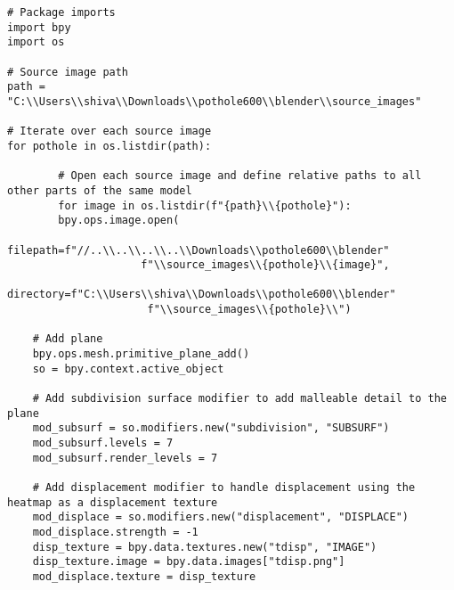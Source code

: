 \documentclass{article}
\begin{document}
\begin{code}
\label{code:blender}
\begin{verbatim}
# Package imports
import bpy
import os

# Source image path
path = "C:\\Users\\shiva\\Downloads\\pothole600\\blender\\source_images"

# Iterate over each source image
for pothole in os.listdir(path):

        # Open each source image and define relative paths to all other parts of the same model
        for image in os.listdir(f"{path}\\{pothole}"):
        bpy.ops.image.open(
            filepath=f"//..\\..\\..\\..\\Downloads\\pothole600\\blender"
                     f"\\source_images\\{pothole}\\{image}",
            directory=f"C:\\Users\\shiva\\Downloads\\pothole600\\blender"
                      f"\\source_images\\{pothole}\\")

    # Add plane
    bpy.ops.mesh.primitive_plane_add()
    so = bpy.context.active_object

    # Add subdivision surface modifier to add malleable detail to the plane
    mod_subsurf = so.modifiers.new("subdivision", "SUBSURF")
    mod_subsurf.levels = 7
    mod_subsurf.render_levels = 7

    # Add displacement modifier to handle displacement using the heatmap as a displacement texture
    mod_displace = so.modifiers.new("displacement", "DISPLACE")
    mod_displace.strength = -1
    disp_texture = bpy.data.textures.new("tdisp", "IMAGE")
    disp_texture.image = bpy.data.images["tdisp.png"]
    mod_displace.texture = disp_texture


\end{verbatim}
\end{code}
\end{document}
